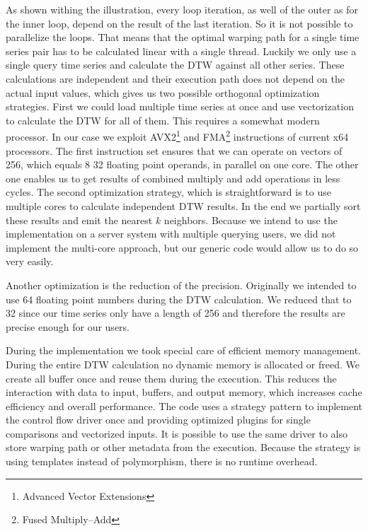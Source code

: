 As shown withing the illustration, every loop iteration, as well of the outer as for the inner loop, depend on the result of the last iteration. So it is not possible to parallelize the loops. That means that the optimal warping path for a single time series pair has to be calculated linear with a single thread. Luckily we only use a single query time series and calculate the DTW against all other series. These calculations are independent and their execution path does not depend on the actual input values, which gives us two possible orthogonal optimization strategies. First we could load multiple time series at once and use vectorization to calculate the DTW for all of them. This requires a somewhat modern processor. In our case we exploit AVX2\footnote{Advanced Vector Extensions} and FMA\footnote{Fused Multiply–Add} instructions of current x64 processors. The first instruction set ensures that we can operate on vectors of \SI{256}{\bit}, which equals \num{8} \SI{32}{\bit} floating point operands, in parallel on one core. The other one enables us to get results of combined multiply and add operations in less cycles. The second optimization strategy, which is straightforward is to use multiple cores to calculate independent DTW results. In the end we partially sort these results and emit the nearest $k$ neighbors. Because we intend to use the implementation on a server system with multiple querying users, we did not implement the multi-core approach, but our generic code would allow us to do so very easily.

Another optimization is the reduction of the precision. Originally we intended to use \SI{64}{\bit} floating point numbers during the DTW calculation. We reduced that to \SI{32}{\bit} since our time series only have a length of \num{256} and therefore the results are precise enough for our users.

During the implementation we took special care of efficient memory management. During the entire DTW calculation no dynamic memory is allocated or freed. We create all buffer once and reuse them during the execution. This reduces the interaction with data to input, buffers, and output memory, which increases cache efficiency and overall performance. The code uses a strategy pattern to implement the control flow driver once and providing optimized plugins for single comparisons and vectorized inputs. It is possible to use the same driver to also store warping path or other metadata from the execution. Because the strategy is using templates instead of polymorphism, there is no runtime overhead.

